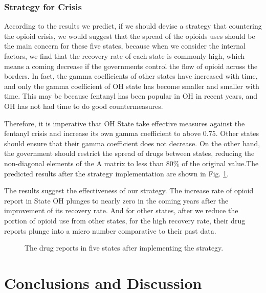 \subsubsection{Strategy for Crisis}
According to the results we predict, if we should devise a strategy that countering the opioid crisis, we would suggest that the spread of the opioids uses should be the main concern for these five states, because when we consider the internal factors, we find that the recovery rate of each state is commonly high, which means a coming decrease if the governments control the flow of opioid across the borders. In fact, the gamma coefficients of other states have increased with time, and only the gamma coefficient of OH state has become smaller and smaller with time. This may be because fentanyl has been popular in OH in recent years, and OH has not had time to do good countermeasures.

Therefore, it is imperative that OH State take effective measures against the fentanyl crisis and increase its own gamma coefficient to above $0.75$. Other states should ensure that their gamma coefficient does not decrease. On the other hand, the government should restrict the spread of drugs between states, reducing the non-diagonal elements of the A matrix to less than $80\%$ of the original value.The predicted results after the strategy implementation are shown in Fig. \ref{drug_five_strategy}.

The results suggest the effectiveness of our strategy. The increase rate of opioid report in State OH plunges to nearly zero in the coming years after the improvement of its recovery rate. And for other states, after we reduce the portion of opioid use from other states, for the high recovery rate, their drug reports plunge into a micro number comparative to their past data.
\begin{figure}[htbp]
\centering
{}
\quad
{}
\quad
{}
\quad
{}
\quad
{}
\caption{The drug reports in five states after implementing the strategy.}\label{drug_five_strategy}
\end{figure}

\section{Conclusions and Discussion}
